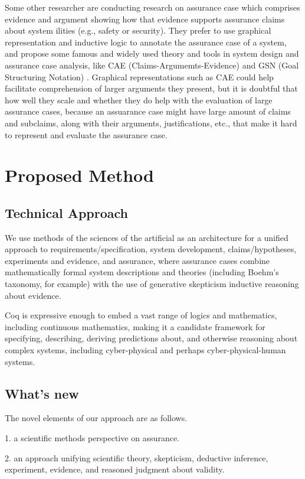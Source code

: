\documentclass{article} %
\begin{document}
Some other researcher are conducting research on assurance case which comprises evidence and argument showing how that evidence supports assurance claims about system ilities (e.g., safety or security). They prefer to use graphical representation and inductive logic to annotate the assurance case of a system, and propose some famous and widely used theory and tools in system design and assurance case analysis, like CAE (Claims-Argumemts-Evidence) \cite{Bloomfied:cae} and GSN (Goal Structuring Notation) \cite{Kelly:gsn}. Graphical representations such as CAE could help facilitate comprehension of larger arguments they present, but it is doubtful that how well they scale and whether they do help with the evaluation of large assurance cases, because an assuarance case might have large amount of claims and subclaims, along with their arguments, justifications, etc., that make it hard to represent and evaluate the assurance case.


\section{Proposed Method}

\subsection{Technical Approach}
We use methods of the sciences of the artificial as an architecture for a unified approach to requirements/specification, system development, claims/hypotheses, experiments and evidence, and assurance, where assurance cases combine mathematically formal system descriptions and theories (including Boehm's taxonomy, for example) with the use of generative skepticism inductive reasoning about evidence.

Coq is expressive enough to embed a vast range of logics and mathematics, including continuous mathematics, making it a candidate framework for specifying, describing, deriving predictions about, and otherwise reasoning about complex systems, including cyber-physical and perhaps cyber-physical-human systems.
\subsection{What's new}
The novel elements of our approach are as follows.

1. a scientific methods perspective on assurance.

2. an approach unifying scientific theory, skepticism, deductive inference, experiment, evidence, and reasoned judgment about validity.
\end{document}
